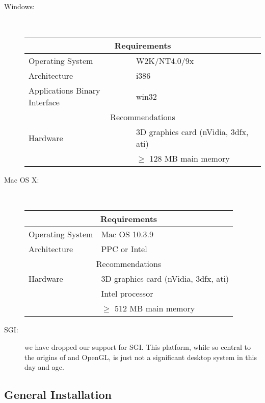 \begin{description}
    \item [Windows: ] \mbox{}\\
          \begin{center}
          \begin{tabular}{|l|l|} \hline
            \multicolumn{2}{|c|}{Requirements} \\ \hline
              Operating System & W2K/NT4.0/9x\\
              Architecture & i386\\
              Applications Binary Interface  &  win32 \\
              \hline
            \multicolumn{2}{|c|}{Recommendations} \\ \hline
            Hardware & 3D graphics card (nVidia, 3dfx, ati)\\
            & $\ge$ 128 MB main memory \\ \hline
          \end{tabular}
          \end{center}

    \item [Mac OS X: ] \mbox{}\\
          \begin{center}
          \begin{tabular}{|l|l|} \hline
            \multicolumn{2}{|c|}{Requirements} \\ \hline
              Operating System & Mac OS 10.3.9\\
              Architecture & PPC or Intel\\
              \hline
            \multicolumn{2}{|c|}{Recommendations} \\ \hline
            Hardware & 3D graphics card (nVidia, 3dfx, ati)\\
            & Intel processor \\
            & $\ge$ 512 MB main memory \\ \hline
          \end{tabular}
          \end{center}
          
   \item [SGI: ] we have dropped our support for SGI.  This platform, while
     so central to the origins of \map{} and OpenGL, is just not a
     significant desktop system in this day and age.  

  \end{description}
  
\subsection{General Installation}

